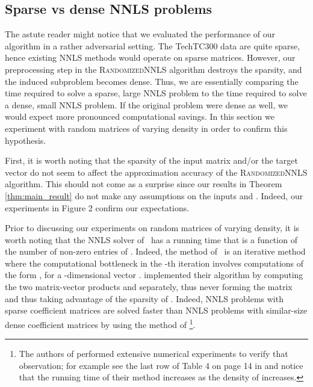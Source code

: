 \documentclass[11pt]{article}
\begin{document}
\subsection{Sparse vs dense NNLS problems}
\label{sec:sparsedense}

The astute reader might notice that we evaluated the performance of our
algorithm in a rather adversarial setting. The TechTC300 data are
quite sparse, hence existing NNLS methods would operate on sparse
matrices. However, our preprocessing step in the
\textsc{RandomizedNNLS} algorithm destroys the sparsity, and the
induced subproblem becomes dense. Thus, we are essentially
comparing the time required to solve a sparse, large NNLS problem
to the time required to solve a dense, small NNLS problem. If the
original problem were dense as well, we would expect more
pronounced computational savings. In this section we experiment
with random matrices of varying density in order to confirm this hypothesis.

First, it is worth noting that the sparsity of the input matrix
 and/or the target vector  do not seem to affect the
approximation accuracy of the \textsc{RandomizedNNLS} algorithm.
This should not come as a surprise since our results in Theorem
\ref{thm:main_result} do not make any assumptions on the inputs
 and . Indeed, our experiments in Figure 2 confirm our
expectations.

Prior to discussing our experiments on random matrices of varying
density, it is worth noting that the NNLS solver of~\cite{KSD07}
has a running time that is a function of the number of non-zero
entries of . Indeed, the method of~\cite{KSD07} is an iterative
method where the computational bottleneck in the -th iteration
involves computations of the form , for a -dimensional
vector . \cite{KSD07} implemented their algorithm by computing
the two matrix-vector products  and 
separately, thus never forming the matrix  and thus taking
advantage of the sparsity of . Indeed, NNLS problems with
sparse coefficient matrices  are solved faster than NNLS
problems with similar-size dense coefficient matrices  by using
the method of \cite{KSD07}\footnote{The authors of \cite{KSD07}
performed extensive numerical experiments to verify that
observation; for example see the last row of Table 4 on page 14 in
\cite{KSD07} and notice that the running time of their method
increases as the density of  increases.}.
\end{document}
